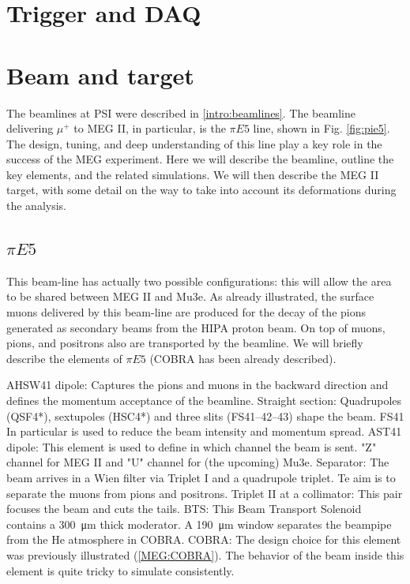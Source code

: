 \begin{refsection}
\section{Trigger and DAQ}

\section{Beam and target}
    The beamlines at PSI were described in \ref{intro:beamlines}. 
    The beamline delivering $\mu^+$ to MEG II, in particular, is the $\pi E5$ line, shown in  Fig. \ref{fig:pie5}.
    The design, tuning, and deep understanding of this line play a key role in the success of the MEG experiment. 
    Here we will describe the beamline, outline the key elements, and the related simulations. 
    We will then describe the MEG II target, with some detail on the way to take into account its deformations during the analysis.

    \subsection{$\pi E5$}
        This beam-line has actually two possible configurations: this will allow the area to be shared between MEG II and Mu3e. 
        As already illustrated, the surface muons delivered by this beam-line are produced for the decay of the pions generated as secondary beams from the HIPA proton beam.
        On top of muons, pions, and positrons also are transported by the beamline.
        We will briefly describe the elements of $\pi E5$ (COBRA has been already described). 

        \begin{outline}
            \1 AHSW41 dipole: Captures the pions and muons in the backward direction and defines the momentum acceptance of the beamline.
            \1 Straight section: Quadrupoles (QSF4*), sextupoles (HSC4*) and three slits (FS41–42–43) shape the beam. FS41 In particular is used to reduce the beam intensity and momentum spread.
            \1 AST41 dipole: This element is used to define in which channel the beam is sent. "Z" channel for MEG II and "U" channel for (the upcoming) Mu3e.
            \1 Separator: The beam arrives in a Wien filter via Triplet I and a quadrupole triplet. Te aim is to separate the muons from pions and positrons.
            \1 Triplet II at a collimator: This pair focuses the beam and cuts the tails.
            \1 BTS: This Beam Transport Solenoid contains a \SI{300}{\micro m} thick \mylar moderator.
            \1 A \SI{190}{\micro m} \mylar window separates the beampipe from the He atmosphere in COBRA.
            \1 COBRA: The design choice for this element was previously illustrated (\ref{MEG:COBRA}). 
            The behavior of the beam inside this element is quite tricky to simulate consistently.
        \end{outline}


\end{refsection}
